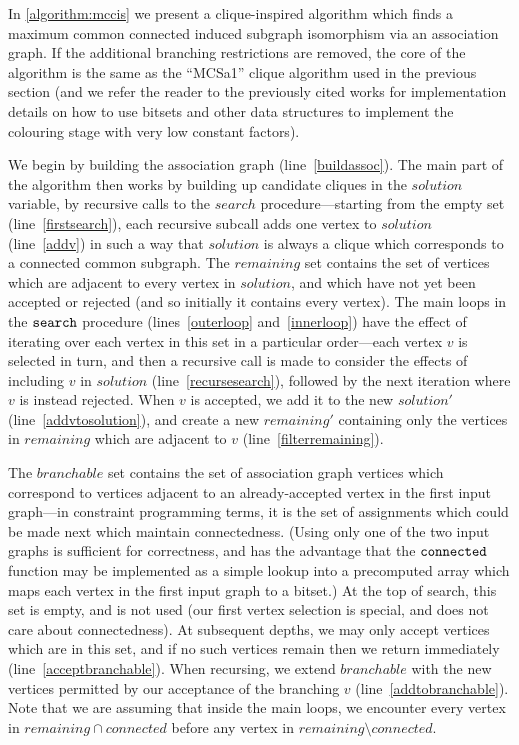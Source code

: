 \documentclass{llncs}
\newcommand{\lineref}[1]{line~\ref{#1}}
\newcommand{\twolinesref}[2]{lines~\ref{#1} and~\ref{#2}}
\begin{document}
In \cref{algorithm:mccis} we present a clique-inspired algorithm which finds a maximum common
connected induced subgraph isomorphism via an association graph. If the additional branching
restrictions are removed, the core of the algorithm is the same as the ``MCSa1'' clique algorithm
used in the previous section (and we refer the reader to the previously cited works for
implementation details on how to use bitsets and other data structures to implement the colouring
stage with very low constant factors).

We begin by building the association graph (\lineref{buildassoc}). The main part of the algorithm
then works by building up candidate cliques in the $\mathit{solution}$ variable, by recursive calls
to the $\mathit{search}$ procedure---starting from the empty set (\lineref{firstsearch}), each
recursive subcall adds one vertex to $\mathit{solution}$ (\lineref{addv}) in such a way that
$\mathit{solution}$ is always a clique which corresponds to a connected common subgraph. The
$\mathit{remaining}$ set contains the set of vertices which are adjacent to every vertex in
$\mathit{solution}$, and which have not yet been accepted or rejected (and so initially it contains
every vertex). The main loops in the $\FuncSty{search}$ procedure
(\twolinesref{outerloop}{innerloop}) have the effect of iterating over each vertex in this set in a
particular order---each vertex $v$ is selected in turn, and then a recursive call is made to
consider the effects of including $v$ in $\mathit{solution}$ (\lineref{recursesearch}), followed by
the next iteration where $v$ is instead rejected. When $v$ is accepted, we add it to the new
$\mathit{solution'}$ (\lineref{addvtosolution}), and create a new $\mathit{remaining'}$ containing
only the vertices in $\mathit{remaining}$ which are adjacent to $v$ (\lineref{filterremaining}).

The $\mathit{branchable}$ set contains the set of association graph vertices which correspond to
vertices adjacent to an already-accepted vertex in the first input graph---in constraint programming terms, it is the
set of assignments which could be made next which maintain connectedness. (Using only one of the two
input graphs is sufficient for correctness, and has the advantage that the $\FuncSty{connected}$
function may be implemented as a simple lookup into a precomputed array which maps each vertex in
the first input graph to a bitset.) At the top of search, this set is empty, and is not used (our
first vertex selection is special, and does not care about connectedness). At subsequent depths, we
may only accept vertices which are in this set, and if no such vertices remain then we return
immediately (\lineref{acceptbranchable}). When recursing, we extend $\mathit{branchable}$ with the
new vertices permitted by our acceptance of the branching $v$ (\lineref{addtobranchable}). Note that
we are assuming that inside the main loops, we encounter every vertex in $\mathit{remaining} \cap
\mathit{connected}$ before any vertex in $\mathit{remaining} \setminus \mathit{connected}$.
\end{document}
